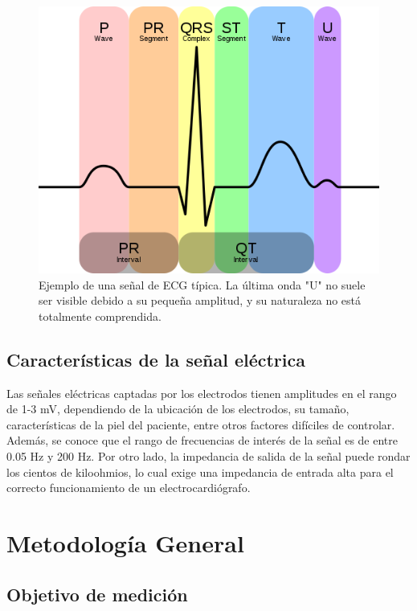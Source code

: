 \documentclass[conference]{IEEEtran}
\begin{document}
\begin{figure}[thb]
    \centerline{\includegraphics[width=0.9\linewidth]{figs/512px-EKG_Complex_en.svg.png}}
    \caption{Ejemplo de una señal de ECG típica. La última onda "U" no suele ser
    visible debido a su pequeña amplitud, y su naturaleza no está totalmente
    comprendida.}
    \label{fig:ecg_onda}
\end{figure}



\subsection{Características de la señal eléctrica}

Las señales eléctricas captadas por los electrodos tienen amplitudes en el rango de
1-3 mV, dependiendo de la ubicación de los electrodos, su tamaño, características
de la piel del paciente, entre otros factores difíciles de controlar. Además, se
conoce que el rango de frecuencias de interés de la señal es de entre
0.05 Hz y 200 Hz. Por otro lado, la impedancia de salida de la señal puede rondar
los cientos de kiloohmios, lo cual exige una impedancia de entrada alta para el
correcto funcionamiento de un electrocardiógrafo.  
 \cite{ecg_signal_amp} \cite{ecg_signal_freq}


\section{Metodología General}

\subsection{Objetivo de medición}
\end{document}
